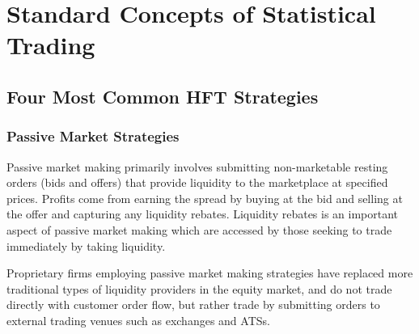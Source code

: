 \documentclass{article}
\begin{document}





\section{Standard Concepts of Statistical Trading}

\subsection{Four Most Common HFT Strategies}

\subsubsection{Passive Market Strategies}

Passive market making primarily involves submitting non-marketable resting orders (bids and offers) that provide liquidity to the marketplace at specified prices. Profits come from earning the spread by buying at the bid and selling at the offer and capturing any liquidity rebates. Liquidity rebates is an important aspect of passive market making which are accessed by those seeking to trade immediately by taking liquidity. 

Proprietary firms employing passive market making strategies have replaced more traditional types of liquidity providers in the equity market, and do not trade directly with customer order flow, but rather trade by submitting orders to external trading venues such as exchanges and ATSs. 
\end{document}
